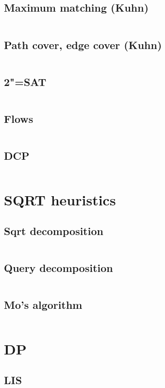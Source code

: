 ﻿\documentclass[10pt,twocolumn,oneside]{article}
\begin{document}
\subsection{Maximum matching (Kuhn)}
\inputminted[breaklines]{cpp}{Graph algorithms/kuhn (with optimizations).cpp}
\subsection{Path cover, edge cover (Kuhn)}
\inputminted[breaklines]{cpp}{Graph algorithms/path cover + edge cover (kuhn).cpp}
\subsection{2"=SAT}
\inputminted[breaklines]{cpp}{Graph algorithms/2-sat.cpp}
\subsection{Flows}
\inputminted[breaklines]{cpp}{Graph algorithms/flows.cpp}
\subsection{DCP}
\inputminted[breaklines]{cpp}{Graph algorithms/dcp.cpp}

\section{SQRT heuristics}
\subsection{Sqrt decomposition}
\inputminted[breaklines]{python}{SQRT heuristics/sqrt decomposition.py}
\subsection{Query decomposition}
\inputminted[breaklines]{cpp}{SQRT heuristics/query decomposition.cpp}
\subsection{Mo's algorithm}
\inputminted[breaklines]{cpp}{SQRT heuristics/mo's algorithm.cpp}

\section{DP}
\subsection{LIS}
\inputminted[breaklines]{cpp}{DP/lis.cpp}
\end{document}
